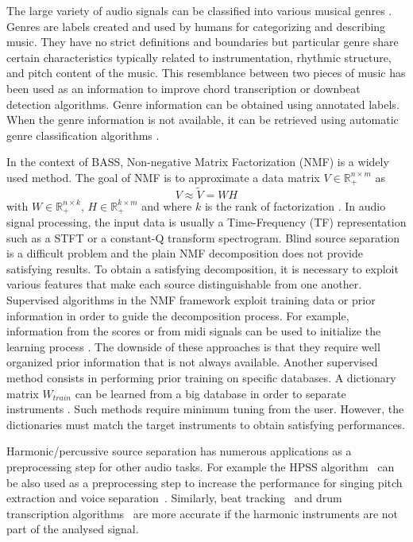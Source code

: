 \documentclass{article}
\begin{document}
The large variety of audio signals can be classified into various musical genres \cite{tzanetakis2002musical}. Genres are labels created and used by humans for categorizing and describing music. They have no strict definitions and boundaries but particular genre share certain characteristics typically related to instrumentation, rhythmic structure, and pitch content of the music. This resemblance between two pieces of music has been used as an information to improve chord transcription \cite{ni2012using,lee2008acoustic} or downbeat detection \cite{hockman2012one} algorithms. Genre information can be obtained using annotated labels. When the genre information is not available, it can be retrieved using automatic genre classification algorithms \cite{tzanetakis2002musical,mckay2006musical}.

In the context of BASS, Non-negative Matrix Factorization (NMF) is a widely used method. The goal of NMF is to approximate a data matrix $V \in \mathbb{R}_{+}^{n \times m} $ as 
\begin{equation}\label{modelNMF}
V \approx \tilde{V} = WH
\end{equation}
with $W \in \mathbb{R}_{+}^{n \times k}$, $H \in \mathbb{R}_{+}^{k \times m}$ and where $k$ is the rank of factorization \cite{lee99}. In audio signal processing, the input data is usually a Time-Frequency (TF) representation such as a STFT or a constant-Q transform spectrogram. Blind source separation is a difficult problem and the plain NMF decomposition does not provide satisfying results. To obtain a satisfying decomposition, it is necessary to exploit various features that make each source distinguishable from one another. 
Supervised algorithms in the NMF framework exploit training data or prior information in order to guide the decomposition process. For example, information from the scores or from midi signals can be used to initialize the learning process \cite{EwertM12}. The downside of these approaches is that they require well organized prior information that is not always available. Another supervised method consists in performing prior training on specific databases. A dictionary matrix $W_{train}$ can be learned from a big database in order to separate instruments \cite{jaureguiberry2011adaptation,wudrum}. Such methods require minimum tuning from the user. However, the dictionaries must match the target instruments to obtain satisfying performances. 


Harmonic/percussive source separation has numerous applications as a preprocessing step for other audio tasks. For example the HPSS algorithm~\cite{fitzgerald2010harmonic} can be also used as a preprocessing step to increase the performance for singing pitch extraction and voice separation~\cite{hsu2012tandem}. 
Similarly, beat tracking~\cite{ellis2007beat} and drum transcription algorithms~\cite{paulus2005drum} are more accurate if the harmonic instruments are not part of the analysed signal. 
\end{document}

